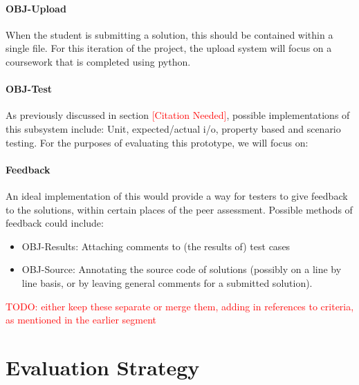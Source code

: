\documentclass[a4paper,11pt]{report}
\newcommand{\cn}{\textcolor{red}{[Citation Needed]}}
\newcommand{\todo}[1]{\textcolor{red}{TODO: #1}}
\begin{document}
\subsubsection*{OBJ-Upload}
When the student is submitting a solution, this should be contained within a single file. For this iteration of the project, the upload system will focus on a coursework that is completed using python.
\subsubsection*{OBJ-Test}
As previously discussed in section \cn, possible implementations of this subsystem include: Unit, expected/actual i/o, property based and scenario testing. For the purposes of evaluating this prototype, we will focus on:
\subsubsection*{Feedback}
An ideal implementation of this would provide a way for testers to give feedback to the solutions, within certain places of the peer assessment. Possible methods of feedback could include:
\begin{itemize}
 \item OBJ-Results: Attaching comments to (the results of) test cases
 \item OBJ-Source: Annotating the source code of solutions (possibly on a line by line basis, or by leaving general comments for a submitted solution).
\end{itemize}
\todo{either keep these separate or merge them, adding in references to criteria, as mentioned in the earlier segment}


\chapter{Evaluation Strategy}
\end{document}
